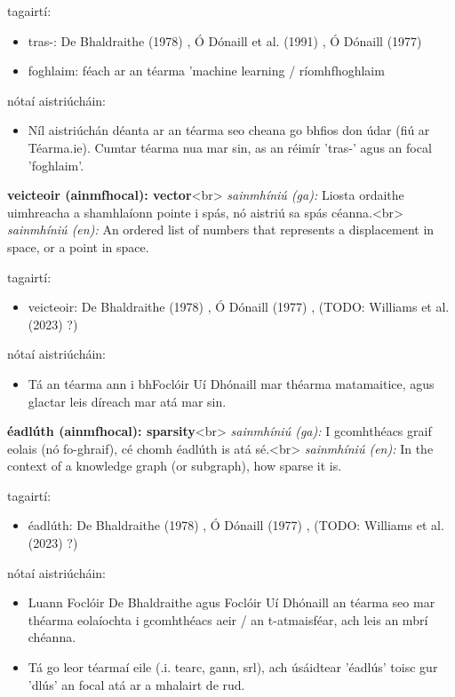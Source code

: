 \documentclass{article}
\begin{document}
tagairtí:
\begin{itemize}
	\item tras-: De Bhaldraithe (1978) \cite{de-bhaldraithe}, Ó Dónaill et al. (1991) \cite{focloir-beag}, Ó Dónaill (1977) \cite{odonaill}
	\item foghlaim: féach ar an téarma 'machine learning / ríomhfhoghlaim
\end{itemize}

nótaí aistriúcháin:
\begin{itemize}
	\item Níl aistriúchán déanta ar an téarma seo cheana go bhfios don údar (fiú ar Téarma.ie). Cumtar téarma nua mar sin, as an réimír 'tras-' agus an focal 'foghlaim'.
\end{itemize}


\textbf{veicteoir (ainmfhocal): vector}<br>
\textit{sainmhíniú (ga):} Liosta ordaithe uimhreacha a shamhlaíonn pointe i spás, nó aistriú sa spás céanna.<br>
\textit{sainmhíniú (en):} An ordered list of numbers that represents a displacement in space, or a point in space.

tagairtí:
\begin{itemize}
	\item veicteoir: De Bhaldraithe (1978) \cite{de-bhaldraithe}, Ó Dónaill (1977) \cite{odonaill}, (TODO: Williams et al. (2023) \cite{storchiste}?)
\end{itemize}

nótaí aistriúcháin:
\begin{itemize}
	\item Tá an téarma ann i bhFoclóir Uí Dhónaill mar théarma matamaitice, agus glactar leis díreach mar atá mar sin.
\end{itemize}


\textbf{éadlúth (ainmfhocal): sparsity}<br>
\textit{sainmhíniú (ga):} I gcomhthéacs graif eolais (nó fo-ghraif), cé chomh éadlúth is atá sé.<br>
\textit{sainmhíniú (en):} In the context of a knowledge graph (or subgraph), how sparse it is.

tagairtí:
\begin{itemize}
	\item éadlúth: De Bhaldraithe (1978) \cite{de-bhaldraithe}, Ó Dónaill (1977) \cite{odonaill}, (TODO: Williams et al. (2023) \cite{storchiste}?)
\end{itemize}

nótaí aistriúcháin:
\begin{itemize}
	\item Luann Foclóir De Bhaldraithe agus Foclóir Uí Dhónaill an téarma seo  mar théarma eolaíochta i gcomhthéacs aeir / an t-atmaisféar, ach leis an mbrí chéanna.
	\item Tá go leor téarmaí eile (.i. tearc, gann, srl), ach úsáidtear 'éadlús' toisc gur 'dlús' an focal atá ar a mhalairt de rud.
\end{itemize}



\printbibliography[title={Tagairtí}]
\end{document}
